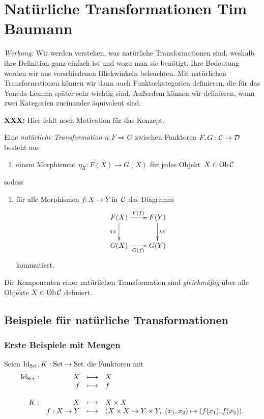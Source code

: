 \section[Natürliche Transformationen]{Natürliche Transformationen \hfill \small
Tim Baumann}

\emph{Werbung:} Wir werden verstehen, was natürliche Transformationen sind,
weshalb ihre Definition ganz einfach ist und wozu man sie benötigt. Ihre
Bedeutung werden wir aus verschiedenen Blickwinkeln beleuchten. Mit natürlichen
Transformationen können wir dann auch Funktorkategorien definieren, die für das
Yoneda-Lemma später sehr wichtig sind. Außerdem können wir definieren, wann
zwei Kategorien zueinander äquivalent sind.

\textbf{XXX:} Hier fehlt noch Motivation für das Konzept.

\begin{defn}Eine \emph{natürliche Transformation} $\eta : F \Rightarrow G$
zwischen Funktoren $F, G : \mathcal{C} \to \mathcal{D}$ besteht aus
\begin{enumerate}
\item[] einem Morphismus~$\eta_X : F(X) \to G(X)$ für jedes Objekt~$X \in \operatorname{Ob} \mathcal{C}$
\end{enumerate}
sodass
\begin{enumerate}
\item[]
für alle Morphismen $f : X \to Y$ in~$\mathcal{C}$ das Diagramm
\[ \xymatrix{
  F(X) \ar[r]^{F(f)} \ar[d]_{\eta_X} & F(Y) \ar[d]^{\eta_Y} \\
  G(X) \ar[r]_{G(f)} & G(Y)
} \]
kommutiert.
\end{enumerate}
\end{defn}

\begin{motto}\label{nattrafoglm}
Die Komponenten einer natürlichen Transformation sind \emph{gleichmäßig} über
alle Objekte $X \in \operatorname{Ob}\mathcal{C}$ definiert.
\end{motto}


\subsection{Beispiele für natürliche Transformationen}


\subsubsection*{Erste Beispiele mit Mengen}

Seien $\mathrm{Id}_{\mathrm{Set}}, K: \mathrm{Set} \to \mathrm{Set}$ die Funktoren mit
\[ \begin{array}{@{}rrcl@{}}
  \Id_\Set: & X &\longmapsto& X \\
  & f &\longmapsto& f \\\\
  K: & X &\longmapsto& X \times X \\
  & f:X\to Y &\longmapsto& (X \times X \to Y \times Y,\ (x_1,x_2) \mapsto (f(x_1),f(x_2)).
\end{array} \]


